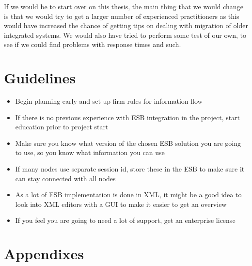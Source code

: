 \documentclass{llncs}
\begin{document}
If we would be to start over on this thesis, the main thing that we would change is that we would try to get a larger number of experienced practitioners as this would have increased the chance of getting tips on dealing with migration of older integrated systems. We would also have tried to perform some test of our own, to see if we could find problems with response times and such.

\section{Guidelines}
\begin{itemize}
\item Begin planning early and set up firm rules for information flow
\item If there is no previous experience with ESB integration in the project, start education prior to project start
\item Make sure you know what version of the chosen ESB solution you are going to use, so you know what information you can use
\item If many nodes use separate session id, store these in the ESB to make sure it can stay connected with all nodes
\item As a lot of ESB implementation is done in XML, it might be a good idea to look into XML editors with a GUI to make it easier to get an overview
\item If you feel you are going to need a lot of support, get an enterprise license
\end{itemize}

\newpage



\newpage
\section*{Appendixes}
\appendix


\end{document}
